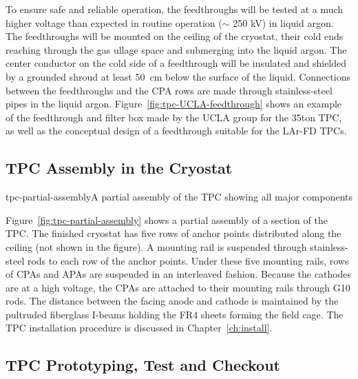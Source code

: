 To ensure safe and reliable operation, the feedthroughs will be 
tested at a much higher voltage than expected in
routine operation ($\sim$ 250 kV) in liquid argon. 
 The feedthroughs will be 
mounted on the ceiling of the cryostat, their cold ends reaching 
through the gas ullage space and submerging into the liquid argon. 
The center conductor on the cold side of a feedthrough will be 
insulated and shielded by a grounded shroud at least 50~cm below the 
surface of the liquid. Connections between the feedthroughs 
and the CPA rows are made through stainless-steel pipes in the 
liquid argon. Figure~\ref{fig:tpc-UCLA-feedthrough} shows an example 
of the feedthrough and filter box made by the UCLA group for the 35ton TPC, as well as the conceptual design of a feedthrough suitable for the LAr-FD TPCs.

\subsection{TPC Assembly in the Cryostat}
\label{subsec:fd-ref-tpc-assbly}


\begin{cdrfigure}{tpc-partial-assembly}{A partial assembly of the TPC showing all major components}
\end{cdrfigure}


Figure~\ref{fig:tpc-partial-assembly} shows a partial assembly of a section of the TPC. The finished cryostat has five rows of anchor points distributed along the ceiling (not shown in the figure). A mounting rail is suspended through stainless-steel rods to each row of the anchor points. Under these five mounting rails, rows of CPAs and APAs are suspended in an interleaved fashion. Because the cathodes are at a high voltage, the CPAs are attached to their mounting rails through G10 rods. The distance between the facing anode and cathode is maintained by the pultruded fiberglass I-beams holding the FR4 sheets forming the field cage. The TPC installation procedure is discussed in  Chapter~\ref{ch:install}.




\subsection{TPC Prototyping, Test and  Checkout}
\label{subsec:fd-ref-tpc-proto}

